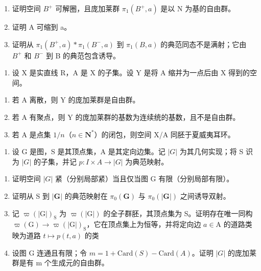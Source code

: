 \begin{enumerate}
\def\labelenumi{\alph{enumi})}
\item
  证明空间 \(B^{+}\) 可解圈，且庞加莱群 \(\pi_{1}(B^{+}, a)\) 是以 N 为基的自由群。
\item
  证明 A 可缩到 a。
\item
  证明从 \(\pi_{1}(B^{+},a)*\pi_{1}(B^{-},a)\) 到 \(\pi_{1}(B,a)\) 的典范同态不是满射；它由 \(B^{+}\) 和 \(B^{-}\) 到 B 的典范包含诱导。
\end{enumerate}

\begin{enumerate}
\def\labelenumi{\arabic{enumi})}
\setcounter{enumi}{5}
\tightlist
\item
  设 X 是实直线 R，A 是 X 的子集。设 Y 是将 A 缩并为一点后由 X 得到的空间。
\end{enumerate}

\begin{enumerate}
\def\labelenumi{\alph{enumi})}
\item
  若 A 离散，则 Y 的庞加莱群是自由群。
\item
  若 A 有聚点，则 Y 的庞加莱群的基数为连续统的基数，且不是自由群。
\item
  若 A 是点集 \(1/n\)（\(n \in \mathbf{N}^*\)）的闭包，则空间 X/A 同胚于夏威夷耳环。
\end{enumerate}

\begin{enumerate}
\def\labelenumi{\arabic{enumi})}
\setcounter{enumi}{6}
\tightlist
\item
  设 G 是图，S 是其顶点集，A 是其定向边集。记 \(|G|\) 为其几何实现；将 S 识为 \(|G|\) 的子集，并记 \(p: I \times A \rightarrow |G|\) 为典范映射。
\end{enumerate}

\begin{enumerate}
\def\labelenumi{\alph{enumi})}
\item
  证明空间 \(|G|\) 紧（分别局部紧）当且仅当图 G 有限（分别局部有限）。
\item
  证明从 S 到 \(|\mathbf{G}|\) 的典范映射在 \(\pi_0(\mathbf{G})\) 与 \(\pi_0(|\mathbf{G}|)\) 之间诱导双射。
\item
  记 \(\varpi(|\mathrm{G}|)_\mathrm{S}\) 为 \(\varpi(|\mathrm{G}|)\) 的全子群胚，其顶点集为 S。证明存在唯一同构 \(\varpi (\mathrm{G})\to \varpi (|\mathrm{G}|)_{\mathrm{S}}\)，它在顶点集上为恒等，并将定向边 \(a\in \mathrm{A}\) 的道路类映为道路 \(t\mapsto p(t,a)\) 的类
\item
  设图 G 连通且有限；令 \(m = 1 + \text{Card}(S) - \text{Card}(A)\)。证明 \(|G|\) 的庞加莱群是有 m 个生成元的自由群。
\end{enumerate}

